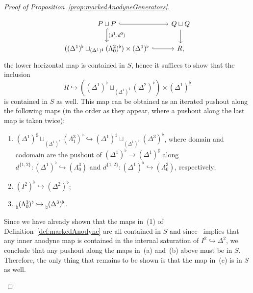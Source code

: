 \documentclass[reqno]{amsart}
\numberwithin{equation}{subsection}
\theoremstyle{plain}
\theoremstyle{definition}
\let\into=\hookrightarrow
\begin{document}
\begin{proof}[{Proof of Proposition~\ref{prop:markedAnodyneGenerators}}]
\begin{enumerate}[resume]
\begin{equation*}
\begin{tikzcd}
		P\sqcup P\arrow[r, hookrightarrow] \arrow[d, hookrightarrow, "{(d^1,d^0)}"] & Q\sqcup Q\arrow[d]\\
		((\Delta^1)^\flat\sqcup_{(\Delta^1)^\sharp}(\Lambda^2_0)^\flat)\times(\Delta^1)^\flat\arrow[r, hookrightarrow] & R,
	\end{tikzcd}
	\end{equation*}
	the lower horizontal map is contained in $S$, hence it suffices to show that the inclusion 
	\begin{equation*}
	R\into ((\Delta^1)^\flat\sqcup_{(\Delta^1)^\sharp}(\Delta^2)^\flat)\times(\Delta^1)^\flat
	\end{equation*}
	is contained in $S$ as well. This map can be obtained as an iterated pushout along the following maps (in the order as they appear, where a pushout along the last map is taken twice):
	\begin{enumerate}
	\item $(\Delta^1)^\sharp\sqcup_{(\Delta^1)^\flat}(\Lambda^3_1)^\flat\into (\Delta^1)^\sharp\sqcup_{(\Delta^1)^\flat}(\Delta^3)^\flat$, where domain and codomain are the pushout of $(\Delta^1)^\flat\to(\Delta^1)^\sharp$ along $d^{\{1,2\}}\colon (\Delta^1)^\flat\into(\Lambda^3_0)$ and $d^{\{1,2\}}\colon (\Delta^1)^\flat\into(\Lambda^3_0)$, respectively;
	\item $(I^2)^\flat\into(\Delta^2)^\flat$;
	\item $\prescript{}{\natural}(\Lambda^3_0)^\flat\into \prescript{}{\natural}(\Delta^3)^\flat$.
	\end{enumerate}
	Since we have already shown that the maps in~(1) of Definition~\ref{def:markedAnodyne} are all contained in $S$ and since~\cite[Lemma~3.2.5]{Martini2021} implies that any inner anodyne map is contained in the internal saturation of $I^2\into\Delta^2$, we conclude that any pushout along the maps in~(a) and~(b) above must be in $S$. Therefore, the only thing that remains to be shown is that the map in~(c) is in $S$ as well.
	

\end{enumerate}
\end{proof}
\end{document}
